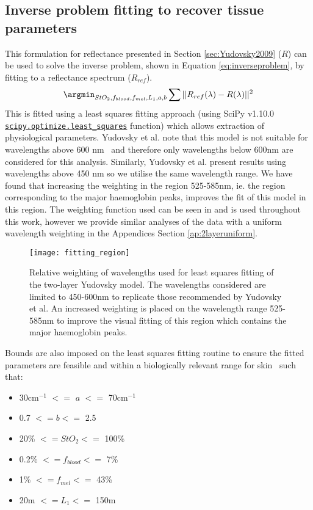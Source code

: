 \subsection{Inverse problem fitting to recover tissue parameters}\label{sec:methodinverse}
This formulation for reflectance presented in Section \ref{sec:Yudovsky2009} ($R$) can be used to solve the inverse problem, shown in Equation \eqref{eq:inverseproblem}, by fitting to a reflectance spectrum ($R_{ref}$). 
\begin{equation}
    \argmin_{StO_2, f_{blood}, f_{mel}, L_1, a, b} \sum || R_{ref}(\lambda) - R(\lambda) ||^2
    \label{eq:inverseproblem}
\end{equation}
This is fitted using a least squares fitting approach (using SciPy v1.10.0  \newline \href{https://docs.scipy.org/doc/scipy/reference/generated/scipy.optimize.least_squares.html}{\texttt{scipy.optimize.least\_squares}} function) which allows extraction of physiological parameters. 
Yudovsky et al. note that this model is not suitable for wavelengths above 600 nm~\citep{Yudovsky2011a} and therefore only wavelengths below 600nm are considered for this analysis. Similarly, Yudovsky et al. present results using wavelengths above 450 nm so we utilise the same wavelength range. We have found that increasing the weighting in the region 525-585nm, ie. the region corresponding to the major haemoglobin peaks, improves the fit of this model in this region. The weighting function used can be seen in  and is used throughout this work, however we provide similar analyses of the data with a uniform wavelength weighting in the Appendices Section \ref{ap:2layeruniform}. 
\begin{figure}
    \centering
    \texttt{[image: fitting\_region]}
    \caption{Relative weighting of wavelengths used for least squares fitting of the two-layer Yudovsky model. The wavelengths considered are limited to 450-600nm to replicate those recommended by Yudovsky et al. An increased weighting is placed on the wavelength range 525-585nm to improve the visual fitting of this region which contains the major haemoglobin peaks.}
    \label{fig:weighting}
\end{figure}
Bounds are also imposed on the least squares fitting routine to ensure the fitted parameters are feasible and within a biologically relevant range for skin~\citep{Yudovsky2009, Jacques2013} such that:
\begin{itemize}
    \item 30cm$^{-1}$ $<=$ $a$ $<=$ 70cm$^{-1}$
    \item 0.7 $<= b <=$ 2.5
    \item 20\% $<= StO_2 <=$ 100\%
    \item 0.2\% $<= f_{blood} <=$ 7\% 
    \item 1\% $<= f_{mel} <=$ 43\% 
    \item 20{\textmu}m $<= L_1 <=$ 150{\textmu}m
\end{itemize}
